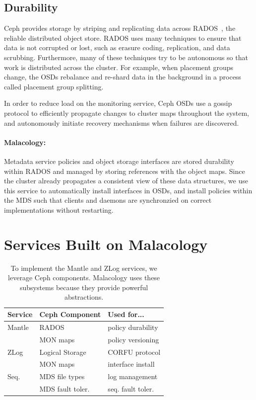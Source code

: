 \documentclass[10pt,twocolumn]{article}
\begin{document}
\subsection{Durability}
\label{sec:durability}

Ceph provides storage by striping and replicating data across
RADOS~\cite{weil_rados_2007}, the reliable distributed object store. RADOS
uses many techniques to ensure that data is not corrupted or lost, such as
erasure coding, replication, and data scrubbing. Furthermore, many of these
techniques try to be autonomous so that work is distributed across the
cluster. For example, when placement groups change, the OSDs rebalance and
re-shard data in the background in a process called placement group splitting.

In order to reduce load on the monitoring service, Ceph OSDs use a gossip
protocol to efficiently propagate changes to cluster maps throughout the
system, and autonomously initiate recovery mechanisms when failures are
discovered.

\paragraph*{Malacology:} Metadata service policies and object storage interfaces are stored durability
within RADOS and managed by storing references with the object maps. Since
the cluster already propagates a consistent view of these data structures,
we use this service to automatically install interfaces in OSDs, and install
policies within the MDS such that clients and daemons are synchronzied on
correct implementations without restarting.



\section{Services Built on Malacology}\label{services-built-on-malacology}

\label{services}

\begin{table}
\centering
\begin{tabular}{  l | l | l    }
\textbf{Service} & \textbf{Ceph Component} & \textbf{Used for...}  \\ \hline
Mantle  & RADOS    & policy durability \\
        & MON maps & policy versioning \\ \hline
ZLog    & Logical Storage & CORFU protocol  \\ 
        & MON maps & interface install \\ \hline
Seq.    & MDS file types & log management \\ 
        & MDS fault toler. & seq. fault toler. \\
\end{tabular}
\caption{To implement the Mantle and ZLog services, we leverage Ceph components. Malacology uses these subsystems because they provide powerful abstractions.}
\label{table:implementation}
\end{table}
\end{document}
